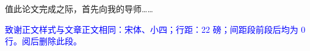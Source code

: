 
\begin{acknowledgements}
  值此论文完成之际，首先向我的导师……

  \textcolor{blue}{致谢正文样式与文章正文相同：宋体、小四；行距：22 磅；间距段前段后均为 0 行。阅后删除此段。}

\end{acknowledgements}
